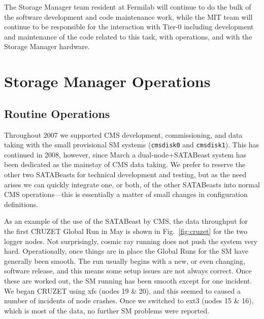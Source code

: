 The Storage Manager team resident at Fermilab will continue to do the bulk of the
software development and code maintenance work, while the MIT team will continue to
be responsible for the interaction with Tier-0 including development and maintenance of
the code related to this task, with operations, and with the
Storage Manager hardware.





\section{Storage Manager Operations}

\subsection{Routine Operations \label{sec:SMexperience}}


Throughout 2007 we supported CMS development, commissioning, and data taking
with the small provisional SM systems (\verb+cmsdisk0+ and \verb+cmsdisk1+).
This has continued in 2008, however,
since March a dual-node$+$SATABeast system has been dedicated
as the mainstay of CMS data taking.
We prefer to reserve the other two SATABeasts for technical development
and testing, but as the need arises we can quickly integrate one, or both,
of the other SATABeasts into normal CMS operations---this is essentially a matter
of small changes in configuration definitions.

As an example of the use of the SATABeast by CMS,
the data throughput for the first CRUZET Global Run in May is shown in Fig.~\ref{fig:cruzet}
for the two logger nodes.
Not surprisingly, cosmic ray running does not push the system very hard.
Operationally, once things are in place the Global Runs for the SM have
generally been smooth.
The run usually begins with a new, or even changing, software release,
and this means some setup issues are not always correct.
Once these are worked out, the SM running has been smooth except for one incident.
We began CRUZET using xfs (nodes 19 \& 20), and this seemed to caused a number
of incidents of node crashes.
Once we switched to ext3 (nodes 15 \& 16), which is most of the data, 
no further SM problems were reported.
 
